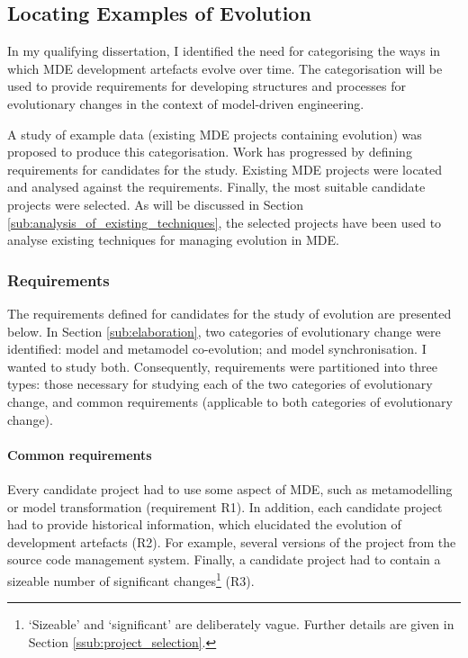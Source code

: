 \subsection{Locating Examples of Evolution}
\label{sub:examples}
In my qualifying dissertation, I identified the need for categorising the ways in which MDE development artefacts evolve over time. The categorisation will be used to provide requirements for developing structures and processes for evolutionary changes in the context of model-driven engineering.

A study of example data (existing MDE projects containing evolution) was proposed to produce this categorisation. Work has progressed by defining requirements for candidates for the study. Existing MDE projects were located and analysed against the requirements. Finally, the most suitable candidate projects were selected. As will be discussed in Section \ref{sub:analysis_of_existing_techniques}, the selected projects have been used to analyse existing techniques for managing evolution in MDE.

\subsubsection{Requirements} %
\label{ssub:requirements}
The requirements defined for candidates for the study of evolution are presented below. In Section \ref{sub:elaboration}, two categories of evolutionary change were identified: model and metamodel co-evolution; and model synchronisation. I wanted to study both. Consequently, requirements were partitioned into three types: those necessary for studying each of the two categories of evolutionary change, and common requirements (applicable to both categories of evolutionary change).

\paragraph{Common requirements}
Every candidate project had to use some aspect of MDE, such as metamodelling or model transformation (requirement R1). In addition, each candidate project had to provide historical information, which elucidated the evolution of development artefacts (R2). For example, several versions of the project from the source code management system. Finally, a candidate project had to contain a sizeable number of significant changes\footnote{`Sizeable' and `significant' are deliberately vague. Further details are given in Section \ref{ssub:project_selection}.} (R3).

